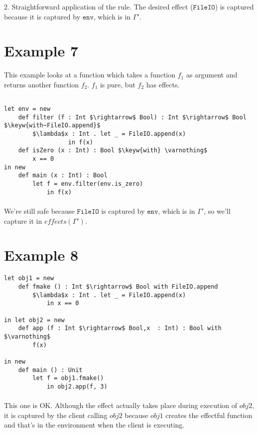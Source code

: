 \documentclass{llncs}
\newcommand{\keywadj}[1]{\mathtt{#1}}
\newcommand{\keyw}[1]{\keywadj{#1}~}
\begin{document}
2. Straightforward application of the rule. The desired effect ($\keywadj{FileIO}$) is captured because it is captured by $\keywadj{env}$, which is in $\Gamma'$.


\section{Example 7}

This example looks at a function which takes a function $f_1$ as argument and returns another function $f_2$. $f_1$ is pure, but $f_2$ has effects.

\vspace{-6pt}
\begin{lstlisting}[xleftmargin=20pt]

let env = new
    def filter (f : Int $\rightarrow$ Bool) : Int $\rightarrow$ Bool $\keyw{with~FileIO.append}$
        $\lambda$x : Int . let _ = FileIO.append(x)
                  in f(x)
    def isZero (x : Int) : Bool $\keyw{with} \varnothing$
        x == 0
in new
    def main (x : Int) : Bool
        let f = env.filter(env.is_zero)
            in f(x)

\end{lstlisting}

\paragraph{}
We're still safe because $\keywadj{FileIO}$ is captured by $\keywadj{env}$, which is in $\Gamma'$, so we'll capture it in $effects(\Gamma')$.


\section{Example 8}

\vspace{-6pt}
\begin{lstlisting}[xleftmargin=20pt]
let obj1 = new
    def fmake () : Int $\rightarrow$ Bool with FileIO.append
        $\lambda$x : Int . let _ = FileIO.append(x)
            in x == 0

in let obj2 = new
    def app (f : Int $\rightarrow$ Bool,x  : Int) : Bool with $\varnothing$
        f(x)
     
in new
    def main () : Unit
        let f = obj1.fmake()
            in obj2.app(f, 3)
\end{lstlisting}

\paragraph{}
This one is OK. Although the effect actually takes place during execution of $obj2$, it is captured by the client calling $obj2$ because $obj1$ creates the effectful function and that's in the environment when the client is executing.
\end{document}
